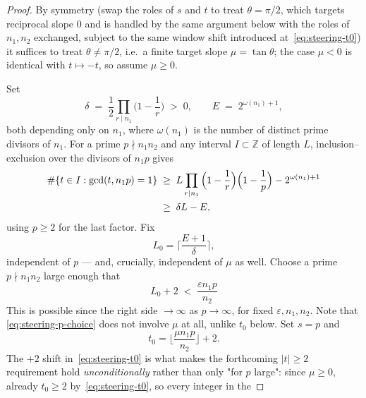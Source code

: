 \documentclass[a4paper,11pt,oneside,reqno]{amsart}
\theoremstyle{definition}
\theoremstyle{remark}
\theoremstyle{plain}
\newcommand{\Z}{\mathbb{Z}}
\begin{document}
\begin{proof}
  By symmetry (swap the roles of \(s\) and \(t\) to treat \(\theta=\pi/2\), which targets reciprocal
  slope \(0\) and is handled by the same argument below with the roles of \(n_1,n_2\) exchanged,
  subject to the same window shift introduced at~\eqref{eq:steering-t0}) it suffices to treat
  \(\theta\ne\pi/2\), i.e.\ a finite target slope \(\mu=\tan\theta\); the case \(\mu<0\) is identical
  with \(t\mapsto-t\), so assume \(\mu\ge0\).

  Set
  \begin{equation}
    \label{eq:steering-constants}
    \delta \;=\; \frac12\prod_{r\mid n_1}\Big(1-\frac1r\Big) \;>\; 0, \qquad E \;=\;
    2^{\omega(n_1)+1},
  \end{equation}
  both depending only on \(n_1\), where \(\omega(n_1)\) is the number of distinct prime divisors of
  \(n_1\). For a prime \(p\nmid n_1n_2\) and any interval \(I\subset\Z\) of length \(L\),
  inclusion--exclusion over the divisors of \(n_1p\) gives
  \begin{align}
    \#\{t\in I : \gcd(t,n_1p)=1\}
      &\;\ge\; L\prod_{r\mid n_1}\Big(1-\frac1r\Big)\Big(1-\frac1p\Big) - 2^{\omega(n_1)+1} \notag\\
      &\;\ge\; \delta L - E, \label{eq:steering-sieve}
  \end{align}
  using \(p\ge2\) for the last factor. Fix
  \begin{equation}
    \label{eq:steering-L0}
    L_0 = \Big\lceil \frac{E+1}{\delta} \Big\rceil,
  \end{equation}
  independent of \(p\) --- and, crucially, independent of \(\mu\) as well. Choose a prime \(p\nmid n_1n_2\)
  large enough that
  \begin{equation}
    \label{eq:steering-p-choice}
    L_0 + 2 \;<\; \frac{\varepsilon n_1p}{n_2}
  \end{equation}
  This is possible since the right side \(\to\infty\) as \(p\to\infty\), for fixed
  \(\varepsilon,n_1,n_2\). Note that \eqref{eq:steering-p-choice} does not involve \(\mu\) at all,
  unlike \(t_0\) below. Set \(s=p\) and
  \begin{equation}
    \label{eq:steering-t0}
    t_0 = \Big\lfloor \frac{\mu n_1p}{n_2} \Big\rfloor + 2.
  \end{equation}
  The \(+2\) shift in~\eqref{eq:steering-t0} is what
  makes the forthcoming \(|t|\ge2\) requirement hold \emph{unconditionally} rather than only "for \(p\)
  large": since \(\mu\ge0\), already \(t_0\ge2\) by~\eqref{eq:steering-t0}, so every integer in the

\end{proof}
\end{document}
